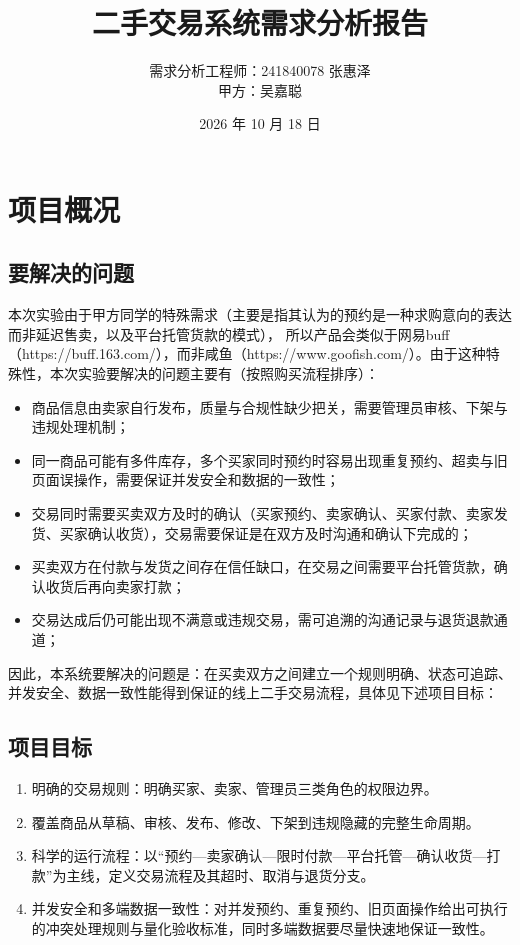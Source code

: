 \documentclass[UTF8,a4paper,zihao=-4]{ctexart}
\title{二手交易系统需求分析报告}
\author{需求分析工程师：241840078 张惠泽\\甲方：吴嘉聪}
\date{2026 年 10 月 18 日}
\begin{document}
\maketitle

\section{项目概况}

\subsection{要解决的问题}
本次实验由于甲方同学的特殊需求（主要是指其认为的预约是一种求购意向的表达而非延迟售卖，以及平台托管货款的模式），
所以产品会类似于网易buff（https://buff.163.com/），而非咸鱼（https://www.goofish.com/）。由于这种特殊性，本次实验要解决的问题主要有（按照购买流程排序）：

\begin{itemize}
  \item 商品信息由卖家自行发布，质量与合规性缺少把关，需要管理员审核、下架与违规处理机制；
  \item 同一商品可能有多件库存，多个买家同时预约时容易出现重复预约、超卖与旧页面误操作，需要保证并发安全和数据的一致性；
  \item 交易同时需要买卖双方及时的确认（买家预约、卖家确认、买家付款、卖家发货、买家确认收货），交易需要保证是在双方及时沟通和确认下完成的；
  \item 买卖双方在付款与发货之间存在信任缺口，在交易之间需要平台托管货款，确认收货后再向卖家打款；
  \item 交易达成后仍可能出现不满意或违规交易，需可追溯的沟通记录与退货退款通道；
\end{itemize}

因此，本系统要解决的问题是：在买卖双方之间建立一个规则明确、状态可追踪、并发安全、数据一致性能得到保证的线上二手交易流程，具体见下述项目目标：

\subsection{项目目标}

\begin{enumerate}
  \item 明确的交易规则：明确买家、卖家、管理员三类角色的权限边界。
  \item 覆盖商品从草稿、审核、发布、修改、下架到违规隐藏的完整生命周期。
  \item 科学的运行流程：以“预约—卖家确认—限时付款—平台托管—确认收货—打款”为主线，定义交易流程及其超时、取消与退货分支。
  \item 并发安全和多端数据一致性：对并发预约、重复预约、旧页面操作给出可执行的冲突处理规则与量化验收标准，同时多端数据要尽量快速地保证一致性。
\end{enumerate}
\end{document}

